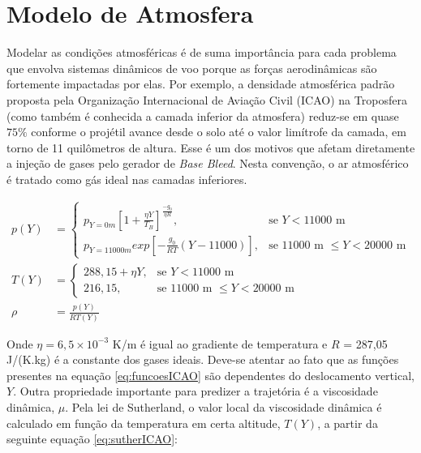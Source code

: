 \section{Modelo de Atmosfera}
\label{sec:ICAOatm}

Modelar as condições atmosféricas é de suma importância para cada problema que envolva sistemas dinâmicos de voo porque as forças aerodinâmicas são fortemente impactadas por elas. Por exemplo, a densidade atmosférica padrão proposta pela Organização Internacional de Aviação Civil (ICAO) \cite{international1993manual} na Troposfera (como também é conhecida a camada inferior da atmosfera) reduz-se em quase $75\%$ conforme o projétil avance desde o solo até o valor limítrofe da camada, em torno de 11 quilômetros de altura. Esse é um dos motivos que afetam diretamente a injeção de gases pelo gerador de \textit{Base Bleed}. Nesta convenção, o ar atmosférico é tratado como gás ideal nas camadas inferiores. 

\begin{equation}
\label{eq:funcoesICAO}
\begin{aligned}
p(Y) &=\begin{cases}
			p_{Y=0 m}\left[1+ \frac{\eta Y}{T_{B}} \right]^{\frac{-g_{0}}{\eta R}} , & \text{se $Y < 11000$ m}\\
            p_{Y=11000 m} exp\left[-\frac{g_{0}}{RT}(Y-11000) \right], & \text{se $11000$ m $\leq Y < 20000$ m}
		 \end{cases}
\\
T(Y) &=\begin{cases}
			288,15 + \eta Y, & \text{se $Y < 11000$ m}\\
            216,15, & \text{se $11000$ m $\leq Y < 20000$ m}
		 \end{cases}
\\
\rho &= \frac{p(Y)}{RT(Y)}
\end{aligned}
\end{equation}

Onde $\eta = 6,5 \times 10^{-3}$ K/m é igual ao gradiente de temperatura e $R$ = 287,05 J/(K.kg) é a constante dos gases ideais. Deve-se atentar ao fato que as funções presentes na equação \ref{eq:funcoesICAO} são dependentes do deslocamento vertical, $Y$. Outra propriedade importante para predizer a trajetória é a viscosidade dinâmica, $\mu$. Pela lei de Sutherland, o valor local da viscosidade dinâmica é calculado em função da temperatura em certa altitude, $T(Y)$, a partir da seguinte equação \ref{eq:sutherICAO}:

